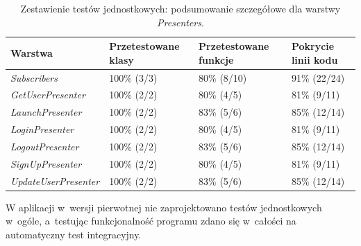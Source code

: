 \begin{table}[!htb]
\centering
\caption{Zestawienie testów jednostkowych: podsumowanie szczegółowe dla warstwy \textit{Presenters}.}
\label{tab:testy_jednostkowe_presenters}
\begin{tabular}{|p{5.8cm}|p{3cm}|p{3cm}|p{3cm}|}
\hline
\textbf{Warstwa} & \textbf{Przetestowane klasy} & \textbf{Przetestowane funkcje} & \textbf{Pokrycie linii kodu} \\ \hline
\textit{Subscribers} & 100\% (3/3) & 80\% (8/10) & 91\% (22/24)	\\ \hline
\textit{GetUserPresenter} & 100\% (2/2) & 80\% (4/5) & 81\% (9/11)	\\ \hline
\textit{LaunchPresenter} & 100\% (2/2) & 83\% (5/6) & 85\% (12/14)	\\ \hline
\textit{LoginPresenter} & 100\% (2/2) & 80\% (4/5) & 81\% (9/11)	\\ \hline
\textit{LogoutPresenter} & 100\% (2/2) & 83\% (5/6) & 85\% (12/14)	\\ \hline
\textit{SignUpPresenter} & 100\% (2/2) & 80\% (4/5) & 81\% (9/11)	\\ \hline
\textit{UpdateUserPresenter} & 100\% (2/2) & 83\% (5/6) & 85\% (12/14)	\\ \hline
\end{tabular}
\end{table}

%
%

W aplikacji w~wersji pierwotnej nie zaprojektowano testów jednostkowych w~ogóle, a~testując funkcjonalność programu zdano się w~całości na automatyczny test integracyjny. 

